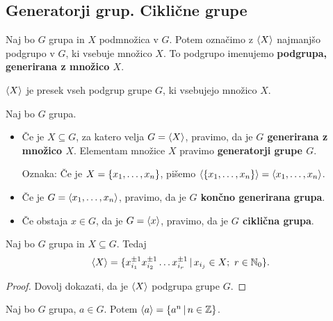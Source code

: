 \subsection{Generatorji grup. Ciklične grupe}

\begin{definicija}
    Naj bo $G$ grupa in $X$ podmnožica v $G$. Potem označimo z $\langle {X} \rangle$ najmanjšo podgrupo v $G$, ki vsebuje množico $X$. To podgrupo imenujemo \textbf{podgrupa, generirana z množico $X$}.
\end{definicija}

\begin{opomba}
    $\langle {X} \rangle$ je presek vseh podgrup grupe $G$, ki vsebujejo množico $X$.
\end{opomba}

\begin{definicija}
    Naj bo $G$ grupa. 
    
    \begin{itemize}
        \item Če je $X \subseteq G$, za katero velja $G = \langle {X} \rangle$, pravimo, da je \textbf{$G$ generirana z množico $X$}. Elementam množice $X$ pravimo \textbf{generatorji grupe $G$}.
        
        Oznaka: Če je $X = \{x_1, \ldots, x_n\}$, pišemo $\langle {\{x_1, \ldots, x_n\}} \rangle = \langle {x_1, \ldots, x_n} \rangle$.
        \item Če je $G = \langle {x_1, \ldots, x_n} \rangle$, pravimo, da je \textbf{$G$ končno generirana grupa}.
        \item Če obstaja $x \in G$, da je $G = \langle {x} \rangle$, pravimo, da je \textbf{$G$ ciklična grupa}.
    \end{itemize}    
\end{definicija}

\begin{trditev}
    Naj bo $G$ grupa in $X \subseteq G$. Tedaj  $$\langle {X} \rangle = \{x_{i_1}^{\pm 1} x_{i_2}^{\pm 1} \ldots x_{i_r}^{\pm 1} \,|\, x_{i_j} \in X; \ r \in \mathbb{N}_0\}.$$
\end{trditev}

\begin{proof}
    Dovolj dokazati, da je $\langle {X} \rangle$ podgrupa grupe $G$.
\end{proof}

\begin{posledica}
    \label{posl:oblika-el-v-gen}
    Naj bo $G$ grupa, $a \in G$. Potem $\langle {a} \rangle = \{a^n \,|\, n \in \mathbb{Z}\}$.
\end{posledica}

